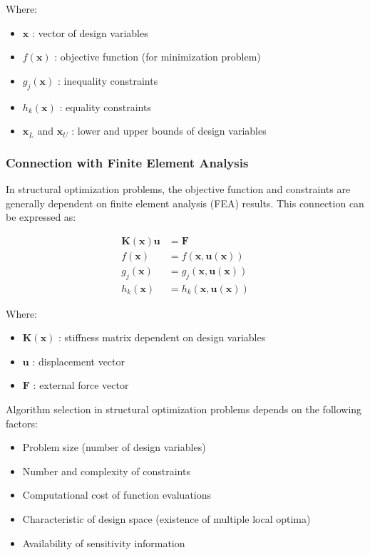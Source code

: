 Where:
\begin{itemize}
    \item $\mathbf{x}$ : vector of design variables
    \item $f(\mathbf{x})$ : objective function (for minimization problem)
    \item $g_j(\mathbf{x})$ : inequality constraints
    \item $h_k(\mathbf{x})$ : equality constraints
    \item $\mathbf{x}_L$ and $\mathbf{x}_U$ : lower and upper bounds of design variables
\end{itemize}

\subsubsection{Connection with Finite Element Analysis}
In structural optimization problems, the objective function and constraints are generally dependent on finite element analysis (FEA) results. This connection can be expressed as:

\begin{align}
\mathbf{K}(\mathbf{x}) \mathbf{u} &= \mathbf{F} \\
f(\mathbf{x}) &= f(\mathbf{x}, \mathbf{u}(\mathbf{x})) \\
g_j(\mathbf{x}) &= g_j(\mathbf{x}, \mathbf{u}(\mathbf{x})) \\
h_k(\mathbf{x}) &= h_k(\mathbf{x}, \mathbf{u}(\mathbf{x}))
\end{align}

Where:
\begin{itemize}
    \item $\mathbf{K}(\mathbf{x})$ : stiffness matrix dependent on design variables
    \item $\mathbf{u}$ : displacement vector
    \item $\mathbf{F}$ : external force vector
\end{itemize}

\begin{tcolorbox}[title=Structural Optimization Algorithm Selection]
Algorithm selection in structural optimization problems depends on the following factors:
\begin{itemize}
    \item Problem size (number of design variables)
    \item Number and complexity of constraints
    \item Computational cost of function evaluations
    \item Characteristic of design space (existence of multiple local optima)
    \item Availability of sensitivity information
\end{itemize}
\end{tcolorbox} 